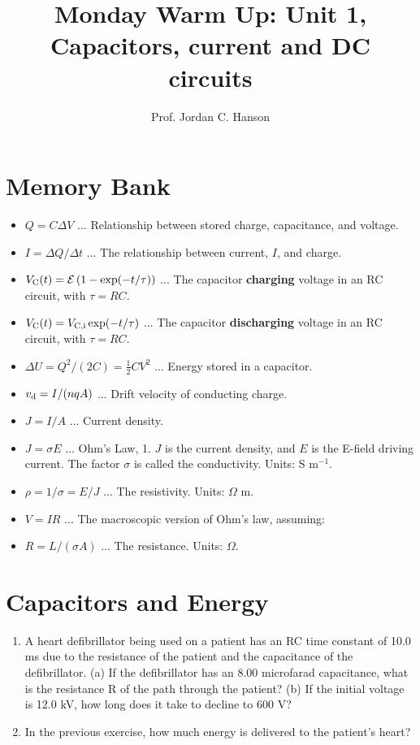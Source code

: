 \documentclass{article}
\begin{document}
\twocolumn

\title{Monday Warm Up: Unit 1, Capacitors, current and DC circuits}
\author{Prof. Jordan C. Hanson}

\maketitle

\section{Memory Bank}

\begin{itemize}
\item $Q = C\Delta V$ ... Relationship between stored charge, capacitance, and voltage.
\item $I = \Delta Q / \Delta t$ ... The relationship between current, $I$, and charge.
\item $V_{\rm C}(t) = \mathcal{E}\left(1 - \exp(-t/\tau)\right)$ ... The capacitor \textbf{charging} voltage in an RC circuit, with $\tau = RC$.
\item $V_{\rm C}(t) = V_{\rm C,i}\exp(-t/\tau)$ ... The capacitor \textbf{discharging} voltage in an RC circuit, with $\tau = RC$.
\item $\Delta U = Q^2/(2C) = \frac{1}{2}CV^2$ ... Energy stored in a capacitor.
\item $v_{\rm d} = I/(n q A)$ ... Drift velocity of conducting charge.
\item $J = I/A$ ... Current density.
\item $J = \sigma E$ ... Ohm's Law, 1.  $J$ is the current density, and $E$ is the E-field driving current.  The factor $\sigma$ is called the conductivity.  Units: S m$^{-1}$.
\item $\rho = 1/\sigma = E/J$ ... The resistivity.  Units: $\Omega$ m.
\item $V = IR$ ... The macroscopic version of Ohm's law, assuming:
\item $R = L/(\sigma A)$ ... The resistance.  Units: $\Omega$.
\end{itemize}

\section{Capacitors and Energy}

\begin{enumerate}
\item A heart defibrillator being used on a patient has an RC time constant of 10.0 ms due to the resistance of the patient and the capacitance of the defibrillator. (a) If the defibrillator has an 8.00 microfarad capacitance, what is the resistance R of the path through the patient? (b) If the initial voltage is 12.0 kV, how long does it take to decline to 600 V? \\ \vspace{2cm}
\item In the previous exercise, how much energy is delivered to the patient's heart? \\ \vspace{1cm}
\end{enumerate}
\end{document}
